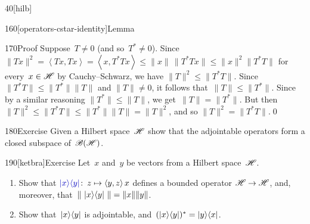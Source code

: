 \begin{parsec}{40}[hilb]
\begin{point}{160}[operators-cstar-identity]{Lemma}
\begin{point}{170}{Proof}
Suppose~$T\neq 0$ (and so~$T^*\neq 0$).
Since $\|Tx\|^2=\left<Tx,Tx\right>=\left<x,T^*Tx\right>
\leq \|x\|\,\|T^*Tx\|\leq \|x\|^2\|T^*T\|$
for every~$x\in \mathscr{H}$
by Cauchy--Schwarz,
we have $\|T\|^2\leq \|T^*T\|$.
Since~$\|T^*T\|\leq \|T^*\|\|T\|$
and $\|T\|\neq 0$,
it follows that~$\|T\|\leq \|T^*\|$.
Since by a similar reasoning $\|T^*\|\leq \|T\|$,
we get~$\|T\|=\|T^*\|$.
But then $\|T\|^2\leq \|T^*T\|\leq \|T^*\|\|T\|=\|T\|^2$,
and so $\|T\|^2=\|T^*T\|$.\qed
\end{point}
\end{point}
\begin{point}{180}{Exercise}%
Given a Hilbert space~$\mathscr{H}$
show that the adjointable operators
form a closed subspace of~$\mathscr{B}(\mathscr{H})$.
\end{point}
\begin{point}{190}[ketbra]{Exercise}%
Let~$x$ and~$y$ be vectors from a Hilbert space~$\mathscr{H}$.
\begin{enumerate}
\item
Show that $\Define{\ketbra{x}{y}}\colon\, z\mapsto\left<y,z\right>x$
defines a bounded operator
$\mathscr{H}\to\mathscr{H}$,
and, moreover, that~$\|\,\left|x\right>\!\left<y\right|\,\|=\|x\|\|y\|$.
\item
Show that~$\left|x\right>\!\left<y\right|$
is adjointable,
and~$(\left|x\right>\!\left<y\right|)^*=\left|y\right>\!\left<x\right|$.
\end{enumerate}
\end{point}
\end{parsec}
